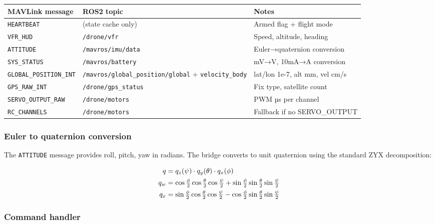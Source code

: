 \documentclass[11pt,a4paper]{article}
\begin{document}
\begin{center}
\begin{tabular}{llp{5cm}}
  \toprule
  \textbf{MAVLink message} & \textbf{ROS2 topic} & \textbf{Notes} \\
  \midrule
  \texttt{HEARTBEAT}         & (state cache only) & Armed flag + flight mode \\
  \texttt{VFR\_HUD}          & \texttt{/drone/vfr} & Speed, altitude, heading \\
  \texttt{ATTITUDE}          & \texttt{/mavros/imu/data} & Euler→quaternion conversion \\
  \texttt{SYS\_STATUS}       & \texttt{/mavros/battery} & mV→V, 10mA→A conversion \\
  \texttt{GLOBAL\_POSITION\_INT} & \texttt{/mavros/global\_position/global} + \texttt{velocity\_body} & lat/lon 1e-7, alt mm, vel cm/s \\
  \texttt{GPS\_RAW\_INT}     & \texttt{/drone/gps\_status} & Fix type, satellite count \\
  \texttt{SERVO\_OUTPUT\_RAW} & \texttt{/drone/motors} & PWM µs per channel \\
  \texttt{RC\_CHANNELS}      & \texttt{/drone/motors} & Fallback if no SERVO\_OUTPUT \\
  \bottomrule
\end{tabular}
\end{center}

\subsubsection{Euler to quaternion conversion}

The \texttt{ATTITUDE} message provides roll, pitch, yaw in radians. The bridge
converts to unit quaternion using the standard ZYX decomposition:

\begin{align}
q &= q_z(\psi) \cdot q_y(\theta) \cdot q_x(\phi) \notag \\
q_w &= \cos\tfrac{\phi}{2}\cos\tfrac{\theta}{2}\cos\tfrac{\psi}{2}
      + \sin\tfrac{\phi}{2}\sin\tfrac{\theta}{2}\sin\tfrac{\psi}{2} \notag \\
q_x &= \sin\tfrac{\phi}{2}\cos\tfrac{\theta}{2}\cos\tfrac{\psi}{2}
      - \cos\tfrac{\phi}{2}\sin\tfrac{\theta}{2}\sin\tfrac{\psi}{2} \notag
\end{align}

\subsubsection{Command handler}
\end{document}
